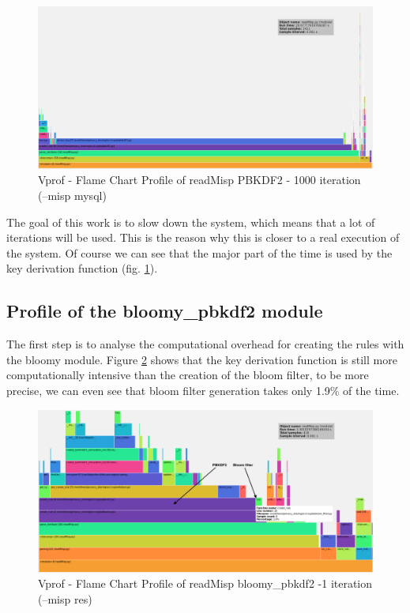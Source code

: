 \documentclass{eplmastersthesis}
\begin{document}
\begin{figure}[h!]
\begin{center}
	\includegraphics[scale=0.3]{res/profile-1000iter}
	\caption{Vprof - Flame Chart Profile of readMisp PBKDF2 - 1000 iteration (--misp mysql)}
	\label{profile-readMisp1000}
\end{center}
\end{figure}

The goal of this work is to slow down the system, which means that a lot of iterations will be used. This is the reason why this is closer to a real execution of the system. Of course we can see that the major part of the time is used by the key derivation function (fig. \ref{profile-readMisp1000}).\\

\subsection{Profile of the bloomy\_pbkdf2 module}
The first step is to analyse the computational overhead for creating the rules with the bloomy module. Figure \ref{profile-bloomy-readMisp-1iter} shows that the key derivation function is still more computationally intensive than the creation of the bloom filter, to be more precise, we can even see that bloom filter generation takes only 1.9\% of the time.\\


\begin{figure}[h!]
\begin{center}
	\includegraphics[scale=0.3]{res/readMisp-bloomy-1iter-res}
	\caption{Vprof - Flame Chart Profile of readMisp bloomy\_pbkdf2 -1 iteration (--misp res)}
	\label{profile-bloomy-readMisp-1iter}
\end{center}
\end{figure}
\end{document}
